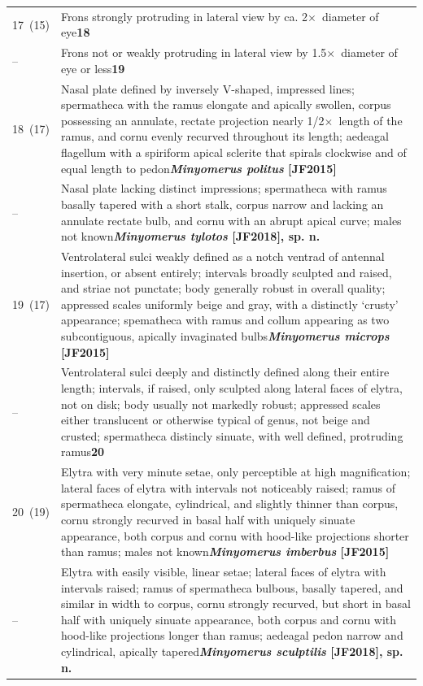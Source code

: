 \documentclass[fleqn,10pt,lineno]{wlpeerj} %
\newcommand{\x}{$\times$~}
\newcommand{\breakfill}{\dotfill\newline\penalty0\hbox{}\nobreak\dotfill}
\begin{document}
\begin{xtabular}{@{}
                p{\dimexpr.1\textwidth-\tabcolsep\relax}
                p{\dimexpr.9\textwidth-\tabcolsep\relax}@{}}
		{17~(15)} & {Frons strongly protruding in lateral view by ca. 2\x diameter of eye}{\dotfill}{\textbf{18}}\\
		{--} & {Frons not or weakly protruding in lateral view by 1.5\x diameter of eye or less}{\dotfill}{\textbf{19}}\\
		
		{18~(17)} & {Nasal plate defined by inversely V-shaped, impressed lines; spermatheca with the ramus elongate and apically swollen, corpus possessing an annulate, rectate projection nearly 1/2\x length of the ramus, and cornu evenly recurved throughout its length; aedeagal flagellum with a spiriform apical sclerite that spirals clockwise and of equal length to pedon}{\breakfill}{\textbf{\textit{Minyomerus politus} [JF2015]}}\\
		{--} & {Nasal plate lacking distinct impressions; spermatheca with ramus basally tapered with a short stalk, corpus narrow and lacking an annulate rectate bulb, and cornu with an abrupt apical curve; males not known}{\dotfill}{\textbf{\textit{Minyomerus tylotos} [JF2018], sp. n.}}\\		
		
		{19~(17)} & {Ventrolateral sulci weakly defined as a notch ventrad of antennal insertion, or absent entirely; intervals broadly sculpted and raised, and striae not punctate; body generally robust in overall quality; appressed scales uniformly beige and gray, with a
distinctly ‘crusty’ appearance; spematheca with ramus and collum appearing
as two subcontiguous, apically invaginated bulbs}{\dotfill}{\textbf{\textit{Minyomerus microps} [JF2015]}}\\
		{--} & {Ventrolateral sulci deeply and distinctly defined along their entire length; intervals, if raised, only sculpted along lateral faces of elytra, not on disk; body usually not markedly robust; appressed scales either translucent or otherwise typical of genus, not beige and crusted; spermatheca distincly sinuate, with well defined, protruding ramus}{\dotfill}{\textbf{20}}\\
		
		{20~(19)} & {Elytra with very minute setae, only perceptible at high magnification; lateral faces of elytra with intervals not noticeably raised; ramus of spermatheca elongate, cylindrical, and slightly thinner than corpus, cornu strongly recurved in basal half with uniquely sinuate appearance, both corpus and cornu with hood-like projections shorter than ramus; males not known}{\breakfill}{\textbf{\textit{Minyomerus imberbus} [JF2015]}}\\
		{--} & {Elytra with easily visible, linear setae; lateral faces of elytra with intervals raised; ramus of spermatheca bulbous, basally tapered, and similar in width to corpus, cornu strongly recurved, but short in basal half with uniquely sinuate appearance, both corpus and cornu with hood-like projections longer than ramus; aedeagal pedon narrow and cylindrical, apically tapered}{\breakfill}{\textbf{\textit{Minyomerus sculptilis} [JF2018], sp. n.}}\\
	\end{xtabular}
\end{document}
